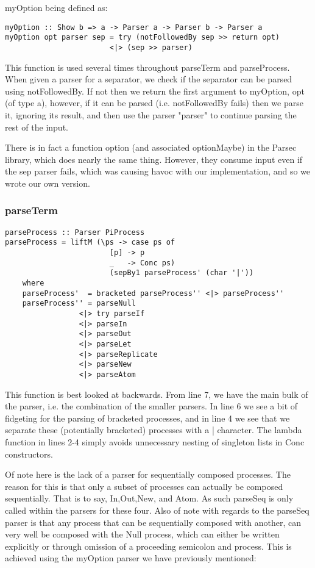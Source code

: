 myOption being defined as:

\begin{verbatim}
myOption :: Show b => a -> Parser a -> Parser b -> Parser a
myOption opt parser sep = try (notFollowedBy sep >> return opt) 
                        <|> (sep >> parser)
\end{verbatim}

This function is used several times throughout parseTerm and parseProcess. When given a parser for a separator, we check if the separator can be parsed using notFollowedBy. If not then we return the first argument to myOption, opt (of type a), however, if it can be parsed (i.e. notFollowedBy fails) then we parse it, ignoring its result, and then use the parser "parser" to continue parsing the rest of the input.

There is in fact a function option (and associated optionMaybe) in the Parsec library, which does nearly the same thing. However, they consume input even if the sep parser fails, which was causing havoc with our implementation, and so we wrote our own version.

\subsubsection{parseTerm}
\begin{verbatim}
parseProcess :: Parser PiProcess
parseProcess = liftM (\ps -> case ps of 
                        [p] -> p
                        _   -> Conc ps) 
                        (sepBy1 parseProcess' (char '|'))
    where
    parseProcess'  = bracketed parseProcess'' <|> parseProcess''
    parseProcess'' = parseNull 
                 <|> try parseIf
                 <|> parseIn 
                 <|> parseOut
                 <|> parseLet
                 <|> parseReplicate
                 <|> parseNew
                 <|> parseAtom
\end{verbatim}

This function is best looked at backwards. From line 7, we have the main bulk of the parser, i.e. the combination of the smaller parsers. In line 6 we see a bit of fidgeting for the parsing of bracketed processes, and in line 4 we see that we separate these (potentially bracketed) processes with a | character. The lambda function in lines 2-4 simply avoids unnecessary nesting of singleton lists in Conc constructors. 

Of note here is the lack of a parser for sequentially composed processes. The reason for this is that only a subset of processes can actually be composed sequentially. That is to say, In,Out,New, and Atom. As such parseSeq is only called within the parsers for these four. Also of note with regards to the parseSeq parser is that any process that can be sequentially composed with another, can very well be composed with the Null process, which can either be written explicitly
or through omission of a proceeding semicolon and process. This is achieved using the myOption parser we have previously mentioned:

